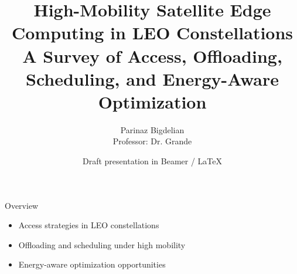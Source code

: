 \documentclass[aspectratio=169,11pt]{beamer}
\title[LEO Satellite Edge Computing Survey]{High-Mobility Satellite Edge Computing in LEO Constellations\\\large A Survey of Access, Offloading, Scheduling, and Energy-Aware Optimization}
\author{Parinaz Bigdelian\\Professor: Dr. Grande}
\institute{COSC 5P06}
\date{Draft presentation in Beamer / LaTeX}
\begin{document}
\begin{frame}
  \titlepage
\end{frame}

\begin{frame}{Overview}
  \begin{itemize}
    \item Access strategies in LEO constellations
    \item Offloading and scheduling under high mobility
    \item Energy-aware optimization opportunities
  \end{itemize}
\end{frame}
\end{document}
